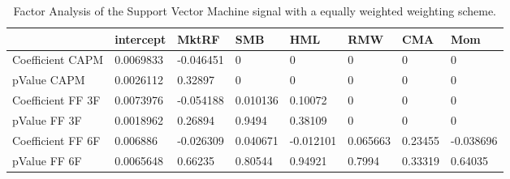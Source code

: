 \begin{table}[H]
\centering
\begin{tabular}{llllllll}
& intercept & MktRF & SMB & HML & RMW & CMA & Mom \\ 
\hline 
Coefficient CAPM & 0.0069833 & -0.046451 & 0 & 0 & 0 & 0 & 0 \\ 
pValue CAPM & 0.0026112 & 0.32897 & 0 & 0 & 0 & 0 & 0 \\ 
Coefficient FF 3F & 0.0073976 & -0.054188 & 0.010136 & 0.10072 & 0 & 0 & 0 \\ 
pValue FF 3F & 0.0018962 & 0.26894 & 0.9494 & 0.38109 & 0 & 0 & 0 \\ 
Coefficient FF 6F & 0.006886 & -0.026309 & 0.040671 & -0.012101 & 0.065663 & 0.23455 & -0.038696 \\ 
pValue FF 6F & 0.0065648 & 0.66235 & 0.80544 & 0.94921 & 0.7994 & 0.33319 & 0.64035 \\ 
\hline
\end{tabular}
\caption{Factor Analysis of the Support Vector Machine signal with a equally weighted weighting scheme.}
\label{SVM_MODEL_EW_FACTOR}
\end{table}
